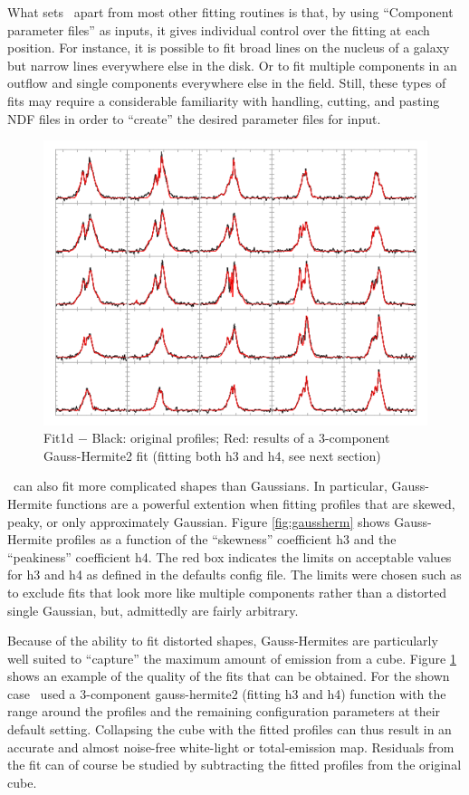 \documentclass[oneside,11pt]{starlink}
\begin{document}
What sets \fitdd\ apart from most other fitting routines is that, by
using ``Component parameter files'' as inputs, it gives individual
control over the fitting at each position. For instance, it is
possible to fit broad lines on the nucleus of a galaxy but narrow
lines everywhere else in the disk. Or to fit multiple components in an
outflow and single components everywhere else in the field. Still,
these types of fits may require a considerable familiarity with
handling, cutting, and pasting NDF files in order to ``create'' the
desired parameter files for input.

\begin{figure}[htb]
  \begin{center}
    \includegraphics[width=0.8\linewidth]{sun258_fit1d_fits}
    \caption{Fit1d $-$ Black: original profiles; Red: results of a
    3-component Gauss-Hermite2 fit (fitting both h3 and h4, see next section)}
    \label{fig:samplefits}
  \end{center}
\end{figure}

\fitdd\ can also fit more complicated shapes than Gaussians. In
particular, Gauss-Hermite functions are a powerful extention when
fitting profiles that are skewed, peaky, or only approximately
Gaussian. Figure \ref{fig:gaussherm} shows Gauss-Hermite profiles as a
function of the ``skewness'' coefficient h3 and the ``peakiness''
coefficient h4. The red box indicates the limits on acceptable values
for h3 and h4 as defined in the defaults config file. The limits were
chosen such as to exclude fits that look more like multiple components
rather than a distorted single Gaussian, but, admittedly are fairly
arbitrary.

Because of the ability to fit distorted shapes, Gauss-Hermites are
particularly well suited to ``capture'' the maximum amount of emission
from a cube. Figure \ref{fig:samplefits} shows an example of the
quality of the fits that can be obtained. For the shown case \fitdd\
used a 3-component gauss-hermite2 (fitting h3 and h4) function with
the range around the profiles and the remaining configuration
parameters at their default setting.  Collapsing the cube with the
fitted profiles can thus result in an accurate and almost noise-free
white-light or total-emission map. Residuals from the fit can of
course be studied by subtracting the fitted profiles from the original
cube.
\end{document}
